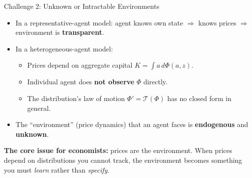 \documentclass[10pt,english,aspectratio=169]{beamer}
\begin{document}
\begin{frame}{Challenge 2: Unknown or Intractable Environments}
\begin{itemize}
    \item In a representative-agent model: agent knows own state $\Rightarrow$ knows prices $\Rightarrow$ environment is \textbf{transparent}.
    \item In a heterogeneous-agent model:
    \begin{itemize}
        \item Prices depend on aggregate capital $K = \int a\, d\Phi(a,z)$.
        \item Individual agent does \textbf{not observe} $\Phi$ directly.
        \item The distribution's law of motion $\Phi' = \mathcal{T}(\Phi)$ has no closed form in general.
    \end{itemize}
    \item The ``environment'' (price dynamics) that an agent faces is \textbf{endogenous} and \textbf{unknown}.
\end{itemize}

\vspace{0.3cm}
\begin{tcolorbox}[colback=VeryLightGray,colframe=RedTitle!60]
\textbf{The core issue for economists:} prices are the environment. When prices depend on distributions you cannot track, the environment becomes something you must \textit{learn} rather than \textit{specify}.
\end{tcolorbox}
\end{frame}
\end{document}
